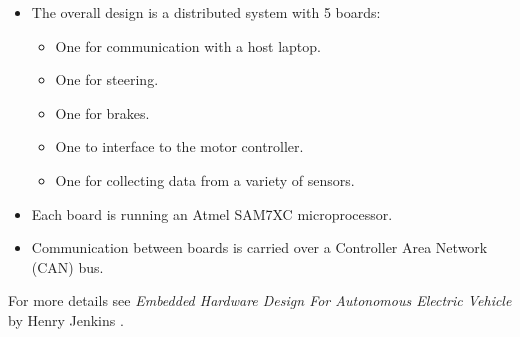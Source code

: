     \renewcommand{\labelitemi}{$\bullet$}
    \renewcommand{\labelitemii}{$\circ$}
    \begin{itemize}
      \item The overall design is a distributed system with 5 boards:
            \begin{itemize}
              \item One for communication with a host laptop.
              \item One for steering.
              \item One for brakes.
              \item One to interface to the motor controller.
              \item One for collecting data from a variety of sensors.
            \end{itemize}

      \item Each board is running an Atmel SAM7XC microprocessor.

      \item Communication between boards is carried over a Controller Area
            Network (CAN) bus.

    \end{itemize}

    For more details see \emph{Embedded Hardware Design For Autonomous Electric
    Vehicle} by Henry Jenkins \cite{jenkins_2011}.
